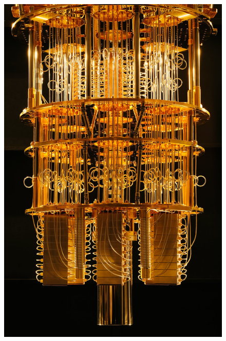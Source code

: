 \documentclass{article}
\begin{document}
\begin{figure}[h!]
	\centering
	\includegraphics[width=\linewidth]{darktheme_fridge_medium.jpg}
\end{figure}
\end{document}
